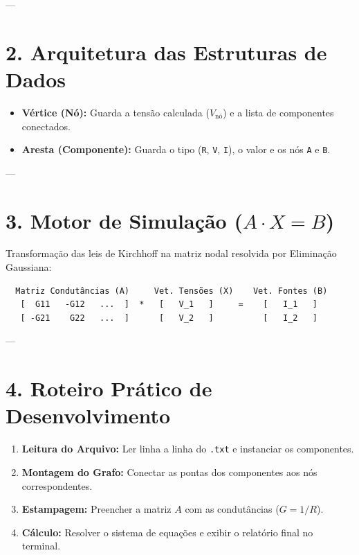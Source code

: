 \documentclass[12pt]{article}
\begin{document}
---

\section{2. Arquitetura das Estruturas de Dados}

\begin{itemize}
    \item \textbf{Vértice (Nó):} Guarda a tensão calculada ($V_{\text{nó}}$) e a lista de componentes conectados.
    \item \textbf{Aresta (Componente):} Guarda o tipo (\texttt{R}, \texttt{V}, \texttt{I}), o valor e os nós \texttt{A} e \texttt{B}.
\end{itemize}

---

\section{3. Motor de Simulação (\texorpdfstring{$A \cdot X = B$}{A . X = B})}

Transformação das leis de Kirchhoff na matriz nodal resolvida por Eliminação Gaussiana:

\begin{verbatim}
  Matriz Condutâncias (A)     Vet. Tensões (X)    Vet. Fontes (B)
   [  G11   -G12   ...  ]  *   [   V_1   ]     =    [   I_1   ]
   [ -G21    G22   ...  ]      [   V_2   ]          [   I_2   ]
\end{verbatim}

---

\section{4. Roteiro Prático de Desenvolvimento}

\begin{enumerate}
    \item \textbf{Leitura do Arquivo:} Ler linha a linha do \texttt{.txt} e instanciar os componentes.
    \item \textbf{Montagem do Grafo:} Conectar as pontas dos componentes aos nós correspondentes.
    \item \textbf{Estampagem:} Preencher a matriz $A$ com as condutâncias ($G = 1/R$).
    \item \textbf{Cálculo:} Resolver o sistema de equações e exibir o relatório final no terminal.
\end{enumerate}
\end{document}
